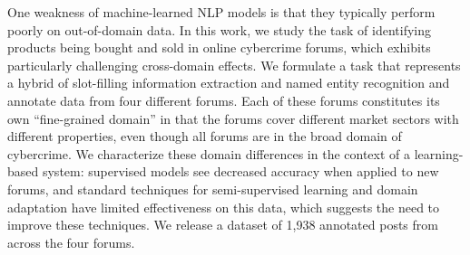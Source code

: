 One weakness of machine-learned NLP models is that they typically perform poorly on out-of-domain data. In this work, we study the task of identifying products being bought and sold in online cybercrime forums, which exhibits particularly challenging cross-domain effects. We formulate a task that represents a hybrid of slot-filling information extraction and named entity recognition and annotate data from four different forums. Each of these forums constitutes its own ``fine-grained domain'' in that the forums cover different market sectors with different properties, even though all forums are in the broad domain of cybercrime. We characterize these domain differences in the context of a learning-based system: supervised models see decreased accuracy when applied to new forums, and standard techniques for semi-supervised learning and domain adaptation have limited effectiveness on this data, which suggests the need to improve these techniques. We release a dataset of 1,938 annotated posts from across the four forums.
